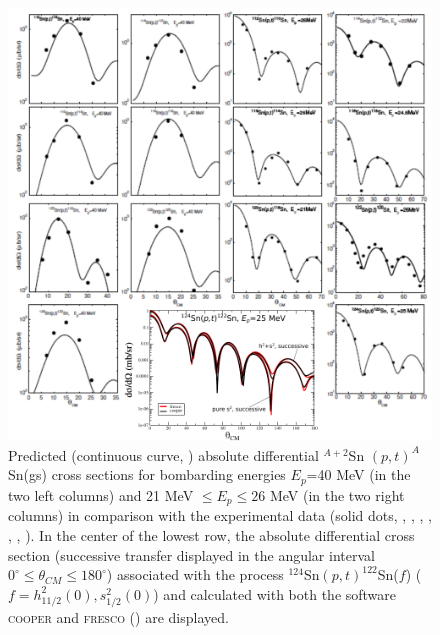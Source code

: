   \begin{figure}
  \centerline{\includegraphics*[width=15cm,angle=0]{C8/figsC8/fig8_2_4}}
  	\caption{Predicted (continuous curve, \cite{Potel:13,Potel:13b}) absolute differential $^{A+2}$Sn $(p,t)^A$Sn(gs) cross sections for bombarding
  	energies $E_p$=40 MeV (in the two left columns) and 21 MeV $\leq E_p \leq 26$ MeV (in the two right columns) in comparison with the
  	experimental data (solid dots, \cite{Bassani:65}, \cite{Guazzoni:99}, \cite{Guazzoni:04}, \cite{Guazzoni:06}, \cite{Guazzoni:08}, \cite{Guazzoni:11}, \cite{Guazzoni:12}). In the center of the lowest row, the absolute differential cross section (successive transfer displayed in the angular interval $0^\circ\leq\theta_{CM}\leq180^\circ$) associated with the process $^{124}$Sn$(p,t)^{122}$Sn($f$) ($f=h_{11/2}^2(0),s_{1/2}^2(0)$) and calculated with both the software \textsc{cooper} and  \textsc{fresco} (\cite{Thompson:88}) are displayed. }\label{fig8_2_4}
  \end{figure}
  



